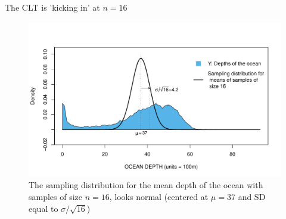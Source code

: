 \documentclass{beamer}\usepackage[]{graphicx}\usepackage[]{color}
\newenvironment{knitrout}{}{} %
\begin{document}
\begin{frame}[fragile]{The CLT is 'kicking in' at $n=16$}

\vspace*{-0.09in}


\begin{knitrout}\scriptsize
{}\color{fgcolor}\begin{figure}

{\centering \includegraphics[width=1\linewidth]{figure/unnamed-chunk-3-1} 

}

\caption[The sampling distribution for the mean depth of the ocean with samples of size $n=16$, looks normal (centered at $\mu=37$ and SD equal to $\sigma/\sqrt{16}$) ]{The sampling distribution for the mean depth of the ocean with samples of size $n=16$, looks normal (centered at $\mu=37$ and SD equal to $\sigma/\sqrt{16}$) }\label{fig:unnamed-chunk-3}
\end{figure}


\end{knitrout}

\end{frame}
\end{document}
